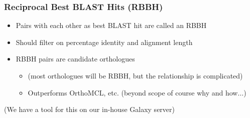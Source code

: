 \documentclass[table]{beamer}
\begin{document}
\begin{frame}
\frametitle{Reciprocal Best BLAST Hits (RBBH)}
\begin{itemize}
\item Pairs with each other as best BLAST hit are called an RBBH
\item Should filter on percentage identity and alignment length
\item RBBH pairs are candidate orthologues
\begin{itemize}
  \item (most orthologues will be RBBH, but the relationship is complicated)
  \item Outperforms OrthoMCL, etc. (beyond scope of course why and how$\ldots$)
\end{itemize}
\end{itemize}
(We have a tool for this on our in-house Galaxy server)
\end{frame}

%
\end{document}
